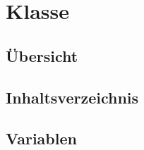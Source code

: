 
\section[EventComputeLowMapper]{Klasse }\label{ontologyFramework.OFDataMapping.ReservatedDataType.EventComputeLowMapper-class}
\subsection{Übersicht}

\subsection{Inhaltsverzeichnis}
\subsection{Variablen}
\begin{description}
\item[{\label{ontologyFramework.OFDataMapping.ReservatedDataType.EventComputeLowMapper.propName}}]
~ 
\end{description}
